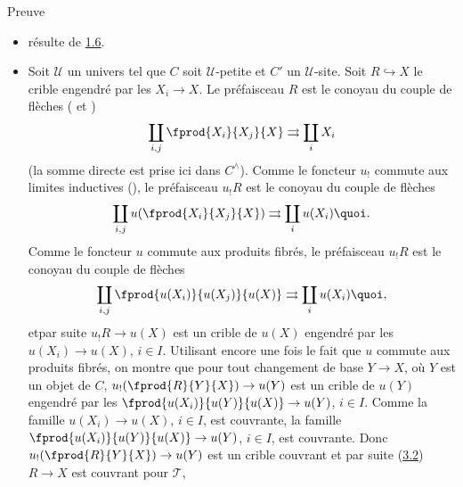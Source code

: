 \documentclass[10pt]{../fichiers-configuration-latex/smfart}
\begin{document}
\begin{enonce*}[remark]{Preuve}
\begin{itemize}
\item[i) $\Rightarrow$ ii):] résulte de \hyperref[III.prop1.6]{1.6}.

\item[ii) $\Rightarrow$ i):] Soit $𝒰$ un univers tel que $C$
  soit $𝒰$-petite et $C'$ un $𝒰$-site. Soit
  $R\hookrightarrow X$ le crible engendré par les $X_i\rightarrow
  X$. Le préfaisceau $R$ est le conoyau du couple de flèches
( et )
$$
\coprod_{i,j} \fprod{X_i}{X_j}{X}\rightrightarrows \coprod_i X_i
$$
(la somme directe est prise ici dans $C^{\wedge}$).
Comme le foncteur $u_{!}$ commute aux limites inductives
(), le préfaisceau $u_{!}R$ est le conoyau du couple
de flèches
$$
\coprod_{i,j}u(\fprod{X_i}{X_j}{X})\rightrightarrows \coprod_i
u(X_i){\quoi}.
$$
Comme le foncteur $u$ commute aux produits fibrés, le
préfaisceau $u_{!}R$ est le conoyau du couple de flèches
$$
\coprod_{i,j}\fprod{u(X_i)}{u(X_j)}{u(X)}\rightrightarrows \coprod_i
u(X_i){\quoi},
$$
et\pageoriginale par suite $u_{!}R\rightarrow u(X)$ est un crible de
$u(X)$ engendré par les $u(X_i)\rightarrow u(X)$, $i\in I$.
Utilisant encore une fois le fait que $u$ commute aux produits
fibrés, on montre que pour tout changement de base $Y\rightarrow
X$, où $Y$ est un objet de $C$, $u_{!}(\fprod{R}{Y}{X})\rightarrow
u(Y)$ est un crible de $u(Y)$ engendré par les
$\fprod{u(X_i)}{u(Y)}{u(X)}\rightarrow u(Y)$, $i\in I$. Comme la
famille $u(X_i)\rightarrow u(X)$, $i\in I$, est couvrante, la
famille $\fprod{u(X_i)}{u(Y)}{u(X)}\rightarrow u(Y)$, $i\in I$, est
couvrante. Donc $u_{!}(\fprod{R}{Y}{X})\rightarrow u(Y)$ est un
crible couvrant et par suite (\hyperref[III.prop3.2]{3.2}) $R\rightarrow X$
est couvrant pour $𝒯$, \cqfd
\end{itemize}
\end{enonce*}
\end{document}
